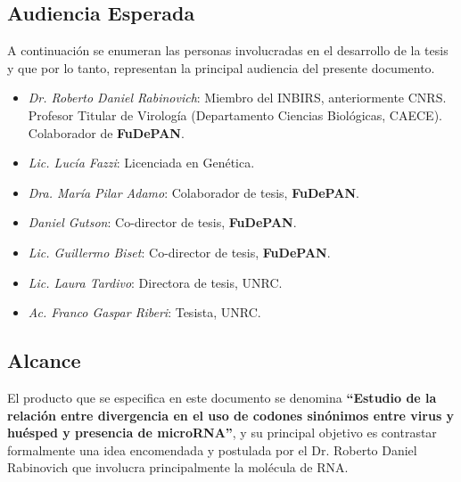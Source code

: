 \documentclass[12pt,a4paper,spanish]{article}
\begin{document}
\subsection{Audiencia Esperada}
\par A continuación se enumeran las personas involucradas en el desarrollo de la
tesis y que por lo tanto, representan la principal audiencia del presente documento.
\begin{itemize}
	\item \textit{Dr. Roberto Daniel Rabinovich}: Miembro del INBIRS, anteriormente CNRS. Profesor Titular de Virología (Departamento Ciencias Biológicas,
 											CAECE). Colaborador de \textbf{FuDePAN}.
	\item \textit{Lic. Lucía Fazzi}: Licenciada en Genética.
	\item \textit{Dra. María Pilar Adamo}: Colaborador de tesis, \textbf{FuDePAN}. 
	\item \textit{Daniel Gutson}: Co-director de tesis, \textbf{FuDePAN}. 
	\item \textit{Lic. Guillermo Biset}: Co-director de tesis, \textbf{FuDePAN}. 
	\item \textit{Lic. Laura Tardivo}: Directora de tesis, UNRC. 
	\item \textit{Ac. Franco Gaspar Riberi}: Tesista, UNRC.
\end{itemize}

\subsection{Alcance}
\par El producto que se especifica en este documento se denomina \textbf{``Estudio de la relación entre divergencia en el uso de codones 
sinónimos entre virus y huésped y presencia de microRNA''}, y su principal objetivo es contrastar formalmente una idea encomendada y
postulada por el Dr. Roberto Daniel Rabinovich que involucra principalmente 
la molécula de RNA. 
\end{document}
